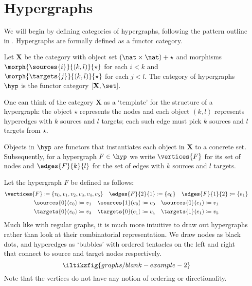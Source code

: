 \section{Hypergraphs}

We will begin by defining categories of hypergraphs, following the
pattern outline in \cite{bonchi2022string}.
Hypergraphs are formally defined as a functor category.

\begin{definition}\label{def:hypergraph}
    Let \(\mathbf{X}\) be the category with object set
    \((\nat \times \nat) + \star\) and morphisms
    \(\morph{\sources{i}}{(k,l)}{\star}\) for each \(i < k\)
    and \(\morph{\targets{j}}{(k,l)}{\star}\) for each \(j < l\).
    The category of hypergraphs \(\hyp\) is the functor category
    \([\mathbf{X}, \set]\).
\end{definition}

One can think of the category \(\mathbf{X}\) as a `template' for the structure
of a hypergraph: the object \(\star\) represents the nodes and each object
\((k, l)\) represents hyperedges with \(k\) sources and \(l\) targets; each such
edge must pick \(k\) sources and \(l\) targets from \(\star\).

Objects in \(\hyp\) are functors that instantiates each object in \(\mathbf{X}\)
to a concrete set.
Subsequently, for a hypergraph \(F \in \hyp\) we write \(\vertices{F}\) for its
set of nodes and \(\edges{F}{k}{l}\) for the set of edges with \(k\) sources and
\(l\) targets.

\begin{example}\label{ex:hypergraph}
    Let the hypergraph \(F\) be defined as follows:
    \begin{gather*}
        \vertices{F} \coloneqq \{v_0,v_1,v_2,v_3,v_4,v_5\}
        \quad
        \edges{F}{2}{1} \coloneqq \{e_0\}
        \quad
        \edges{F}{1}{2} \coloneqq \{e_1\}
        \\
        \sources{0}(e_0) \coloneqq v_1
        \quad
        \sources{1}(e_0) \coloneqq v_0
        \quad
        \sources{0}(e_1) \coloneqq v_1
        \\
        \targets{0}(e_0) \coloneqq v_3
        \quad
        \targets{0}(e_1) \coloneqq v_4
        \quad
        \targets{1}(e_1) \coloneqq v_5
    \end{gather*}
    Much like with regular graphs, it is much more intuitive to draw out hypergraphs
    rather than look at their combinatorial representation.
    We draw nodes as black dots, and hyperedges as `bubbles' with ordered tentacles
    on the left and right that connect to source and target nodes respectively.
    \[
        \iltikzfig{graphs/blank-example-2}
    \]
    Note that the vertices do not have any notion of ordering or directionality.
\end{example}

